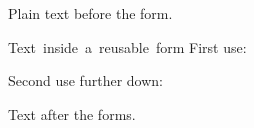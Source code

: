 \documentclass{article}
\begin{document}
Plain text before the form.

\setbox\formbox\hbox{Text inside a reusable form}
\pdfxform\formbox
\edef\theform{\the\pdflastxform}
First use: \pdfrefxform\theform

Second use further down: \pdfrefxform\theform

Text after the forms.
\end{document}
